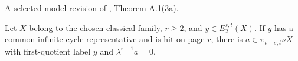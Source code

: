 \begin{theorem}
\label{frontier:Literature:90a18b9fe1e0}
A selected-model revision of \cite{BHS}, Theorem A.1(3a).\par

Let $X$ belong to the chosen classical family, $r\ge2$, and $y\in E_2^{s,t}(X)$. If $y$ has a common infinite-cycle representative and is hit on page $r$, there is $a\in\pi_{t-s,t}\nu X$ with first-quotient label $y$ and $\lambda^{r-1}a=0$.
\end{theorem}

